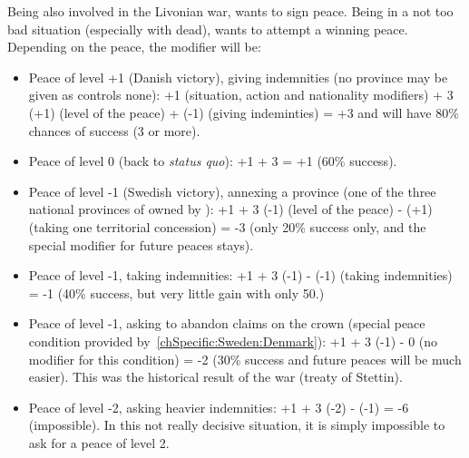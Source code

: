 \begin{exemple}
  Being also involved in the Livonian war, \SUE wants to sign peace. Being in
  a not too bad situation (especially with \leaderRantzau dead), \SUE wants to
  attempt a winning peace. Depending on the peace, the modifier will be:
  \begin{itemize}
  \item Peace of level +1 (Danish victory), giving indemnities (no province
    may be given as \paysDanemark controls none): +1 (situation, action and
    nationality modifiers) + 3 \textmultiply (+1) (level of the peace) + (-1)
    (giving indeminties) = +3 and will have 80\% chances of success (3 or
    more).
  \item Peace of level 0 (back to \emph{status quo}): +1 + 3 
    = +1 (60\% success).
  \item Peace of level -1 (Swedish victory), annexing a province (one of the
    three national provinces of \SUE owned by \paysDanemark): +1 + 3
    \textmultiply (-1) (level of the peace) - (+1) (taking one territorial
    concession) = -3 (only 20\% success only, and the special modifier for
    future peaces stays).
  \item Peace of level -1, taking indemnities: +1 + 3 \textmultiply (-1) -
    (-1) (taking indemnities) = -1 (40\% success, but very little gain with
    only 50\ducats.)
  \item Peace of level -1, asking \paysDanemark to abandon claims on the crown
    (special peace condition provided by~\ref{chSpecific:Sweden:Denmark}): +1
    + 3 \textmultiply (-1) - 0 (no modifier for this condition) = -2 (30\%
    success and future peaces will be much easier). This was the historical
    result of the war (treaty of Stettin).
  \item Peace of level -2, asking heavier indemnities: +1 + 3 \textmultiply
    (-2) - (-1) = -6 (impossible). In this not really decisive situation, it
    is simply impossible to ask for a peace of level 2.
  \end{itemize}
\end{exemple}

